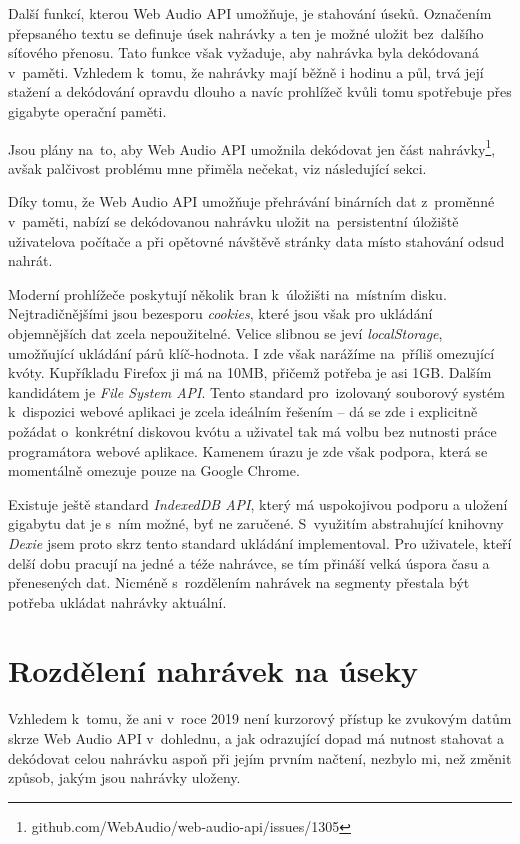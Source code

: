 Další funkcí, kterou Web Audio API umožňuje, je stahování úseků. Označením
přepsaného textu se definuje úsek nahrávky a ten je možné uložit bez~dalšího
síťového přenosu. Tato funkce však vyžaduje, aby nahrávka byla dekódovaná
v~paměti. Vzhledem k~tomu, že nahrávky mají běžně i hodinu a půl, trvá její
stažení a dekódování opravdu dlouho a navíc prohlížeč kvůli tomu spotřebuje přes
gigabyte operační paměti.

Jsou plány na~to, aby Web Audio API umožnila dekódovat jen část
nahrávky\footnote{github.com/WebAudio/web-audio-api/issues/1305}, avšak
palčivost problému mne přiměla nečekat, viz následující sekci.

Díky tomu, že Web Audio API umožňuje přehrávání binárních dat z~proměnné
v~paměti, nabízí se dekódovanou nahrávku uložit na~persistentní úložiště
uživatelova počítače a při opětovné návštěvě stránky data místo stahování odsud
nahrát.

Moderní prohlížeče poskytují několik bran k~úložišti na~místním disku.
Nejtradičnějšími jsou bezesporu \textit{cookies}, které jsou však pro ukládání
objemnějších dat zcela nepoužitelné. Velice slibnou se jeví
\textit{localStorage}, umožňující ukládání párů klíč-hodnota. I zde však
narážíme na~příliš omezující kvóty. Kupříkladu Firefox ji má na 10MB, přičemž
potřeba je asi 1GB. Dalším kandidátem je \textit{File System API}. Tento
standard pro~izolovaný souborový systém k~dispozici webové aplikaci je zcela
ideálním řešením -- dá se zde i explicitně požádat o~konkrétní diskovou kvótu a
uživatel tak má volbu bez nutnosti práce programátora webové aplikace. Kamenem
úrazu je zde však podpora, která se momentálně omezuje pouze na Google Chrome.

Existuje ještě standard \textit{IndexedDB API}, který má uspokojivou
podporu a uložení gigabytu dat je s~ním možné, byť ne zaručené. S~využitím
abstrahující knihovny \textit{Dexie} jsem proto skrz tento standard ukládání
implementoval. Pro uživatele, kteří delší dobu pracují na jedné a téže nahrávce,
se tím přináší velká úspora času a přenesených dat. Nicméně s~rozdělením
nahrávek na segmenty přestala být potřeba ukládat nahrávky aktuální.

\section{Rozdělení nahrávek na úseky}
\label{sec:segmenty}

Vzhledem k~tomu, že ani v~roce 2019 není kurzorový přístup ke zvukovým datům
skrze Web Audio API v~dohlednu, a jak odrazující dopad má nutnost
stahovat a dekódovat celou nahrávku aspoň při jejím prvním načtení, nezbylo mi,
než změnit způsob, jakým jsou nahrávky uloženy. %

